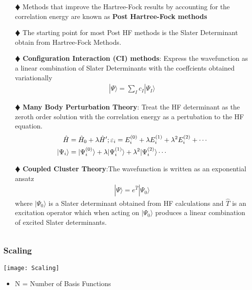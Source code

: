 \documentclass[slidestop,mathserif,compress,xcolor=svgnames]{beamer}
\begin{document}
\begin{frame}
\scriptsize{
\begin{columns}
\column{12cm}
\vspace{-0.5cm}
\begin{block}{}
\begin{itemize}
\item[$\vardiamond$]Methods that improve the Hartree-Fock results by accounting for the correlation energy are known as {\bf Post Hartree-Fock methods}
\item[$\vardiamond$]The starting point for most Post HF methods is the Slater Determinant obtain from Hartree-Fock Methods.
\item[$\vardiamond$]{\bf Configuration Interaction (CI) methods}: Express the wavefunction as a linear combination of Slater Determinants with the coeffcients obtained variationally
\begin{align*}
|\Psi\rangle = \sum_Ic_I|\Psi_I\rangle
\end{align*}
\item[$\vardiamond$]{\bf Many Body Perturbation Theory}: Treat the HF determinant as the zeroth order solution with the correlation energy as a pertubation to the HF equation.
\begin{align*}
\hat{H} &= \hat{H}_0 + \lambda\hat{H}^\prime\vspace{0.5cm};\vspace{0.5cm}
\varepsilon_i = E^{(0)}_i + \lambda E^{(1)}_i + \lambda^2E^{(2)}_i + \cdots\\
|\Psi_i\rangle &= |\Psi^{(0)}_i\rangle + \lambda|\Psi^{(1)}_i\rangle + \lambda^2|\Psi^{(2)}_i\rangle\cdots
\end{align*}
\item[$\vardiamond$]{\bf Coupled Cluster Theory}:The wavefunction is written as an exponential ansatz
\begin{align*}
|\Psi\rangle = e^{\hat{T}}|\Psi_0\rangle
\end{align*}
where $|\Psi_0\rangle$ is a Slater determinant obtained from HF calculations and $\hat{T}$ is an excitation operator which when acting on $|\Psi_0\rangle$ produces a linear combination of excited Slater determinants.
\end{itemize}
\end{block}
\end{columns}
}
\end{frame}

\begin{frame}
\frametitle{\small Scaling}
\begin{center}
\vspace{-1cm}
\texttt{[image: Scaling]}%
\end{center}
\vspace{-1cm}
\begin{itemize}
\item N = Number of Basis Functions
\end{itemize}
\end{frame}
\end{document}
